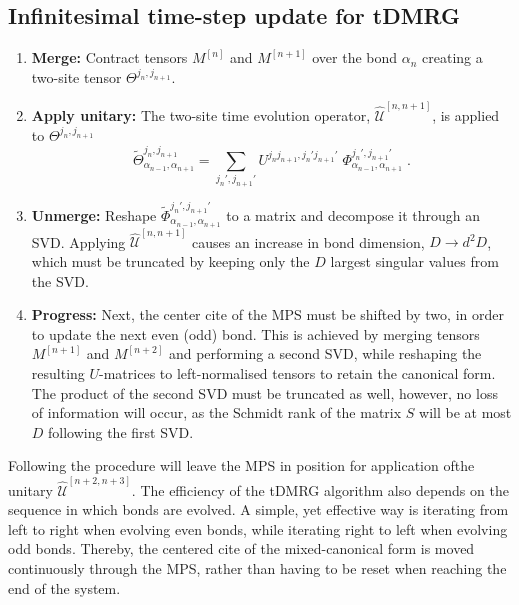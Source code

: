 \subsection{Infinitesimal time-step update for tDMRG}
\begin{enumerate}
\item
\textbf{Merge:} Contract tensors $M^{[n]}$ and $M^{[n+1]}$ over the bond $\alpha_{n}$ creating a two-site tensor $\Theta^{j_n , j_{n+1}}$.

\item
\textbf{Apply unitary:} The two-site time evolution operator, $\hat{\mathcal{U}}^{[n, n+1]}$, is applied to $\Theta^{j_n , j_{n+1}}$
\begin{equation}
	\tilde{\Theta}_{\alpha_{n-1} , \alpha_{n+1}}^{j_n , j_{n+1} } = \sum_{j_n ', j_{n+1}'} U^{j_n  j_{n+1} , j_n '  j_{n+1}'} \; \Phi_{\alpha_{n-1} , \alpha_{n+1}}^{j_n ', j_{n+1} ' } \; .
\end{equation}

\item
\textbf{Unmerge:} Reshape $\tilde{\Phi}_{\alpha_{n-1} , \alpha_{n+1}}^{j_n ', j_{n+1} '}$ to a matrix and decompose it through an SVD. Applying $\hat{\mathcal{U}}^{[n, n+1]}$ causes an increase in bond dimension, $D \rightarrow d^2 D$, which must be truncated by keeping only the $D$ largest singular values from the SVD. 

\item
\textbf{Progress:}  Next, the center cite of the MPS must be shifted by two, in order to update the next even (odd) bond. This is achieved by merging tensors $M^{[n+1]}$ and $M^{[n+2]}$ and performing a second SVD, while reshaping the resulting $U$-matrices to left-normalised tensors to retain the canonical form. The product of the second SVD must be truncated as well, however, no loss of information will occur, as the Schmidt rank of the matrix $S$ will be at most $D$ following the first SVD. 
\end{enumerate}
Following the procedure will leave the MPS in position for application ofthe unitary $\hat{\mathcal{U}}^{[n+2 , n+3]}$. The efficiency of the tDMRG algorithm also depends on the sequence in which bonds are evolved. A simple, yet effective way is iterating from left to right when evolving even bonds, while iterating right to left when evolving odd bonds. Thereby, the centered cite of the mixed-canonical form is moved continuously through the MPS, rather than having to be reset when reaching the end of the system.\\

